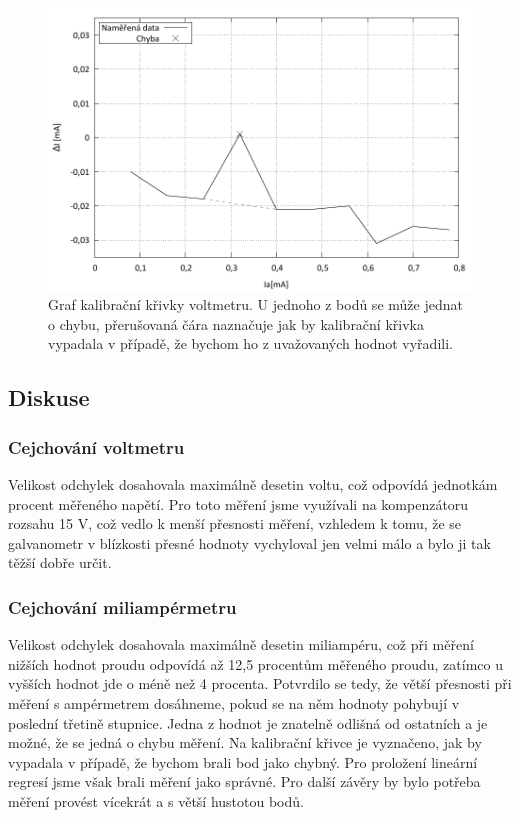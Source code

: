 \documentclass[english]{article}
\begin{document}
\begin{figure}[p]
\begin{center}
	\vspace*{-1cm}
	\includegraphics[width=\linewidth]{../gnuplot/7_kompenzator_cejamper_kalib_out.pdf}
	\vspace*{-1cm}
	\caption{Graf kalibrační křivky voltmetru. U jednoho z bodů se může jednat o chybu, přerušovaná čára naznačuje jak by kalibrační křivka vypadala v případě, že bychom ho z uvažovaných hodnot vyřadili.}
	\label{fig:g_cejchovani_a_kalib}
\end{center}
\end{figure}

\subsection{Diskuse}
\subsubsection{Cejchování voltmetru}
Velikost odchylek dosahovala maximálně desetin voltu, což odpovídá jednotkám procent měřeného napětí. Pro toto měření jsme využívali na kompenzátoru rozsahu 15 V, což vedlo k menší přesnosti měření, vzhledem k tomu, že se galvanometr v blízkosti přesné hodnoty vychyloval jen velmi málo a bylo ji tak těžší dobře určit. 

\subsubsection{Cejchování miliampérmetru}
Velikost odchylek dosahovala maximálně desetin miliampéru, což při měření nižších hodnot proudu odpovídá až 12,5 procentům měřeného proudu, zatímco u vyšších hodnot jde o méně než 4 procenta. Potvrdilo se tedy, že větší přesnosti při měření s ampérmetrem dosáhneme, pokud se na něm hodnoty pohybují v poslední třetině stupnice. Jedna z hodnot je znatelně odlišná od ostatních a je možné, že se jedná o chybu měření. Na kalibrační křivce je vyznačeno, jak by vypadala v případě, že bychom brali bod jako chybný. Pro proložení lineární regresí jsme však brali měření jako správné. Pro další závěry by bylo potřeba měření provést vícekrát a s větší hustotou bodů.
\end{document}
